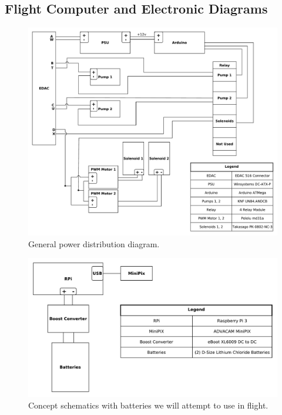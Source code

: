 \newpage
\subsection{Flight Computer and Electronic Diagrams}

\begin{figure}[!h]
\begin{center}
\includegraphics[scale=.5]{./Figures/power-distro.pdf}
\caption{General power distribution diagram.}
\label{fig:power-distro}
\end{center}
\end{figure}

\newpage
\begin{figure}[!h]
\begin{center}
\includegraphics[scale=.5]{./Figures/rpi-batteries.pdf}
\caption{Concept schematics with batteries we will attempt to use in flight.}
\label{fig:rpi-batteries}
\end{center}
\end{figure}

